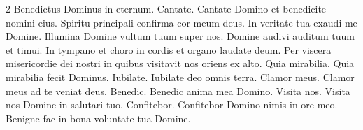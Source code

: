 \begin{multicols*}{2}
 Benedictus Dominus in eternum.
 Cantate.
 Cantate Domino et benedicite nomini eius.
 Spiritu principali confirma cor meum deus.
 In veritate tua exaudi me Domine.
 Illumina Domine vultum tuum super nos.
 Domine audivi auditum tuum et timui.
 In tympano et choro in cordis et organo laudate deum.
 Per viscera misericordie dei nostri in quibus visitavit nos oriens ex alto.
 Quia mirabilia.
 Quia mirabilia fecit Dominus.
 Iubilate.
 Iubilate deo omnis terra.
 Clamor meus.
 Clamor meus ad te veniat deus.
 Benedic.
 Benedic anima mea Domino.
 Visita nos.
 Visita nos Domine in salutari tuo.
 Confitebor.
 Confitebor Domino nimis in ore meo.
 Benigne fac in bona voluntate tua Domine.

\end{multicols*}
